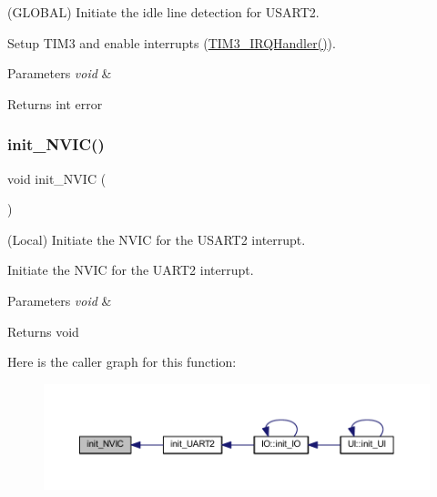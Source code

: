 (G\+L\+O\+B\+AL) Initiate the idle line detection for U\+S\+A\+R\+T2. 

Setup T\+I\+M3 and enable interrupts (\mbox{\hyperlink{namespace_u_a_r_t_ac8e51d2183b5230cbd5481f8867adce9}{T\+I\+M3\+\_\+\+I\+R\+Q\+Handler()}}).


\begin{DoxyParams}{Parameters}
{\em void} & \\
\hline
\end{DoxyParams}
\begin{DoxyReturn}{Returns}
int error 
\end{DoxyReturn}
\mbox{\label{namespace_u_a_r_t_aa21807f2e7d59396d1c411f436ebd29b}} 
\subsubsection{\texorpdfstring{init\+\_\+\+N\+V\+I\+C()}{init\_NVIC()}}
{\footnotesize\ttfamily void init\+\_\+\+N\+V\+IC (\begin{DoxyParamCaption}\item[{void}]{ }\end{DoxyParamCaption})}



(Local) Initiate the N\+V\+IC for the U\+S\+A\+R\+T2 interrupt. 

Initiate the N\+V\+IC for the U\+A\+R\+T2 interrupt.


\begin{DoxyParams}{Parameters}
{\em void} & \\
\hline
\end{DoxyParams}
\begin{DoxyReturn}{Returns}
void 
\end{DoxyReturn}
Here is the caller graph for this function\+:\nopagebreak
\begin{figure}[H]
\begin{center}
\leavevmode
\includegraphics[width=350pt]{namespace_u_a_r_t_aa21807f2e7d59396d1c411f436ebd29b_icgraph}
\end{center}
\end{figure}
\mbox{\label{namespace_u_a_r_t_a532deb6ee0fb4aa5ef9700438be59c0f}} 
